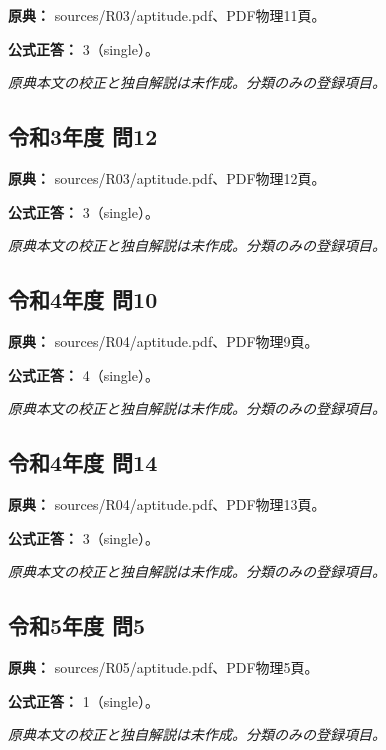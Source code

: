 \noindent\textbf{原典：} sources/R03/aptitude.pdf、PDF物理11頁。

\textbf{公式正答：} 3（single）。

\par\textit{原典本文の校正と独自解説は未作成。分類のみの登録項目。}

\subsection{令和3年度 問12}
\label{q:r03-reg-apt-12}

\noindent\textbf{原典：} sources/R03/aptitude.pdf、PDF物理12頁。

\textbf{公式正答：} 3（single）。

\par\textit{原典本文の校正と独自解説は未作成。分類のみの登録項目。}

\subsection{令和4年度 問10}
\label{q:r04-reg-apt-10}

\noindent\textbf{原典：} sources/R04/aptitude.pdf、PDF物理9頁。

\textbf{公式正答：} 4（single）。

\par\textit{原典本文の校正と独自解説は未作成。分類のみの登録項目。}

\subsection{令和4年度 問14}
\label{q:r04-reg-apt-14}

\noindent\textbf{原典：} sources/R04/aptitude.pdf、PDF物理13頁。

\textbf{公式正答：} 3（single）。

\par\textit{原典本文の校正と独自解説は未作成。分類のみの登録項目。}

\subsection{令和5年度 問5}
\label{q:r05-reg-apt-05}

\noindent\textbf{原典：} sources/R05/aptitude.pdf、PDF物理5頁。

\textbf{公式正答：} 1（single）。

\par\textit{原典本文の校正と独自解説は未作成。分類のみの登録項目。}

